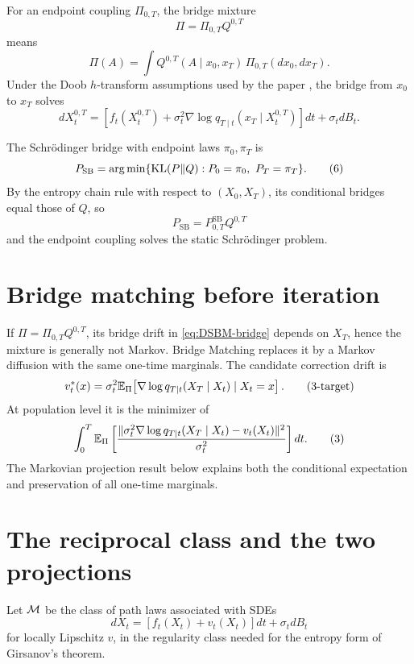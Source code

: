 For an endpoint coupling \(\Pi_{0,T}\), the bridge mixture
\[
 \Pi=\Pi_{0,T}Q^{0,T}
\]
means
\[
 \Pi(A)=\int Q^{0,T}(A\mid x_0,x_T)\,\Pi_{0,T}(dx_0,dx_T).
\]
Under the Doob $h$-transform assumptions used by the paper \cite{RogersWilliams2000,PalmowskiRolski2002}, the bridge from \(x_0\) to \(x_T\) solves
\begin{equation}
 dX_t^{0,T}
 =\left[f_t(X_t^{0,T})+\sigma_t^2\nabla\log q_{T\mid t}(x_T\mid X_t^{0,T})\right]dt
 +\sigma_t dB_t.
 \tag{2}\label{eq:DSBM-bridge}
\end{equation}

The Schr\"odinger bridge with endpoint laws \(\pi_0,\pi_T\) is
\begin{equation}
 P_{\mathrm{SB}}
 =\operatorname*{arg\,min}\{\mathrm{KL}(P\|Q):P_0=\pi_0,\ P_T=\pi_T\}.
 \tag{6}\label{eq:DSBM-SB}
\end{equation}
By the entropy chain rule with respect to \((X_0,X_T)\), its conditional bridges equal those of \(Q\), so
\[
 P_{\mathrm{SB}}=P^{\mathrm{SB}}_{0,T}Q^{0,T}
\]
and the endpoint coupling solves the static Schr\"odinger problem.

\section{Bridge matching before iteration}
If \(\Pi=\Pi_{0,T}Q^{0,T}\), its bridge drift in \eqref{eq:DSBM-bridge} depends on \(X_T\), hence the mixture is generally not Markov.  Bridge Matching replaces it by a Markov diffusion with the same one-time marginals.  The candidate correction drift is
\begin{equation}
 v_t^*(x)
 =\sigma_t^2\mathbb{E}_\Pi\!
 \left[\nabla\log q_{T\mid t}(X_T\mid X_t)\mid X_t=x\right].
 \tag{3-target}\label{eq:DSBM-vstar}
\end{equation}
At population level it is the minimizer of
\begin{equation}
 \int_0^T\mathbb{E}_\Pi\left[
 \frac{\|\sigma_t^2\nabla\log q_{T\mid t}(X_T\mid X_t)-v_t(X_t)\|^2}{\sigma_t^2}
 \right]dt.
 \tag{3}\label{eq:DSBM-regression}
\end{equation}
The Markovian projection result below explains both the conditional expectation and preservation of all one-time marginals.

\section{The reciprocal class and the two projections}
Let \(\mathcal{M}\) be the class of path laws associated with SDEs
\[
 dX_t=[f_t(X_t)+v_t(X_t)]dt+\sigma_t dB_t
\]
for locally Lipschitz \(v\), in the regularity class needed for the entropy form of Girsanov's theorem.


